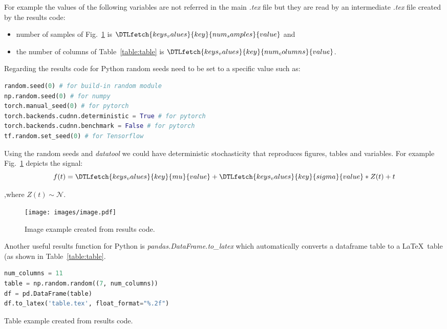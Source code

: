 \documentclass[journal]{IEEEtran}
\begin{document}
For example the values of the following variables are not referred in the main \textit{.tex} file but they are read by an intermediate \textit{.tex} file created by the results code:
\begin{itemize}
	\item number of samples of Fig.~\ref{fig:image} is $\DTLfetch{keys_values}{key}{num_samples}{value}$ and
	\item the number of columns of Table~\ref{table:table} is $\DTLfetch{keys_values}{key}{num_columns}{value}$.
\end{itemize}

Regarding the results code for Python random seeds need to be set to a specific value such as:
\begin{lstlisting}[language=python, style=lststyle, caption={Python reproducibility commands for some popular libraries.}, captionpos=b]
random.seed(0) # for build-in random module
np.random.seed(0) # for numpy
torch.manual_seed(0) # for pytorch
torch.backends.cudnn.deterministic = True # for pytorch
torch.backends.cudnn.benchmark = False # for pytorch
tf.random.set_seed(0) # for Tensorflow
\end{lstlisting}

Using the random seeds and \textit{datatool} we could have deterministic stochasticity that reproduces figures, tables and variables.
For example Fig.~\ref{fig:image} depicts the signal:
\begin{equation}
	f(t) = \DTLfetch{keys_values}{key}{mu}{value} + \DTLfetch{keys_values}{key}{sigma}{value} * Z(t) + t
\end{equation}

,where $Z(t)\sim\mathcal{N}$.

\begin{figure}[h]
	\texttt{[image: images/image.pdf]}
	\caption{Image example created from results code.}
	\label{fig:image}
\end{figure}

Another useful results function for Python is \textit{pandas.DataFrame.to\_latex} which automatically converts a dataframe table to a \LaTeX\ table (as shown in Table~\ref{table:table}.

\begin{lstlisting}[language=python, style=lststyle, caption={Convert Pandas DataFrame to \LaTeX\ table.}, captionpos=b]
num_columns = 11
table = np.random.random((7, num_columns))
df = pd.DataFrame(table)
df.to_latex('table.tex', float_format="%.2f")
\end{lstlisting}

\begin{table}[h]
	\centering
	\caption{Table example created from results code.}
	\label{table:table}
	\setlength\tabcolsep{4.2pt}
	
\end{table}



\end{document}

